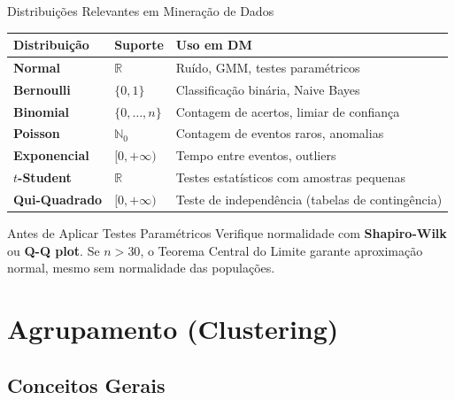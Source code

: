 \documentclass[aspectratio=169]{beamer}
\begin{document}
\begin{frame}[shrink=8]{Distribuições Relevantes em Mineração de Dados}
    \begin{center}\footnotesize
    \renewcommand{\arraystretch}{1.35}
    \begin{tabular}{>{\bfseries}lp{3.2cm}p{4.8cm}}
    \toprule
    Distribuição & Suporte & Uso em DM \\
    \midrule
    Normal & $\mathbb{R}$ & Ruído, GMM, testes paramétricos \\
    Bernoulli & $\{0,1\}$ & Classificação binária, Naive Bayes \\
    Binomial & $\{0,\ldots,n\}$ & Contagem de acertos, limiar de confiança \\
    Poisson & $\mathbb{N}_0$ & Contagem de eventos raros, anomalias \\
    Exponencial & $[0,+\infty)$ & Tempo entre eventos, outliers \\
    $t$-Student & $\mathbb{R}$ & Testes estatísticos com amostras pequenas \\
    Qui-Quadrado & $[0,+\infty)$ & Teste de independência (tabelas de contingência) \\
    \bottomrule
    \end{tabular}
    \end{center}
    \pause
    \begin{alertblock}{Antes de Aplicar Testes Paramétricos}
        \footnotesize Verifique normalidade com \textbf{Shapiro-Wilk} ou \textbf{Q-Q plot}. Se $n > 30$, o Teorema Central do Limite garante aproximação normal, mesmo sem normalidade das populações.
    \end{alertblock}
\end{frame}

\section{Agrupamento (Clustering)}

\subsection{Conceitos Gerais}
\end{document}
